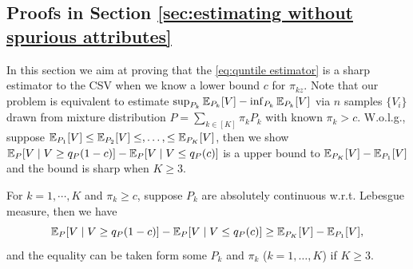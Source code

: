 \subsection{Proofs in Section \ref{sec:estimating without spurious attributes}}\label{app:proof of sec:estimating without spurious attributes}
In this section we aim at proving that the \eqref{eq:quntile estimator} is a sharp estimator to the CSV when we know a lower bound $c$ for $\pi_{kz}$. Note that our problem is equivalent to estimate $\sup_{P_{k}}\mathbb{E}_{P_{k}}[V] - \inf_{P_{k}}\mathbb{E}_{P_{k}}[V]$ via $n$ samples $\{V_{i}\}$ drawn from mixture distribution $P = \sum_{k\in[K]}\pi_{k}P_{k}$ with known $\pi_{k} > c$. W.o.l.g., suppose $\mathbb{E}_{P_{1}}[V] \leq \mathbb{E}_{P_{2}}[V] \leq, \dots, \leq \mathbb{E}_{P_{K}}[V]$, then we show $\mathbb{E}_{P}[V\mid V\geq q_{P}(1-c)] - \mathbb{E}_{P}[V\mid V\leq q_{P}(c)]$ is a upper bound to $\mathbb{E}_{P_{K}}[V] - \mathbb{E}_{P_{1}}[V]$ and the bound is sharp when $K\geq 3$. 
\begin{proposition}
	For $k=1,\cdots, K$ and $\pi_{k}\geq c$, suppose $P_{k}$ are absolutely continuous w.r.t. Lebesgue measure, then we have 
	\begin{equation}\label{eq: upper bound CSV}
		\small
		\mE_{P}[V\mid V\geq q_{P}(1 - c)] - \mE_{P}[V\mid V\leq q_{P}(c)] \geq \mE_{P_{K}}[V] - \mE_{P_{1}}[V],
	\end{equation}
	and the equality can be taken form some $P_{k}$ and $\pi_{k}$ ($k = 1,\dots, K$) if $K \geq 3$. 
\end{proposition}
